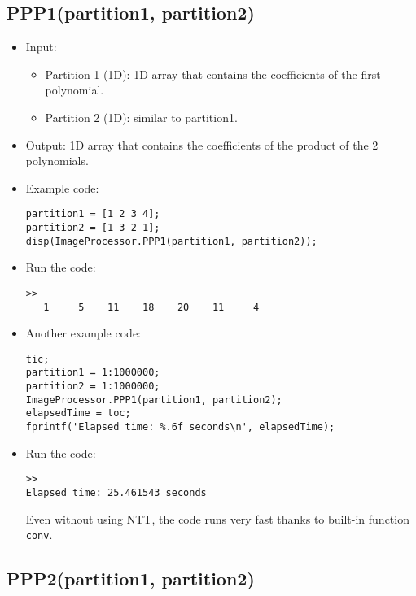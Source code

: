 \documentclass[11pt]{amsart}
\theoremstyle{remark}
\providecommand{\tightlist}{%
  \setlength{\itemsep}{0pt}\setlength{\parskip}{0pt}}
\theoremstyle{definition}
\theoremstyle{remark}
\numberwithin{equation}{section}
\begin{document}
\subsection{PPP1(partition1,
partition2)}\label{ppp1partition1-partition2}

\begin{itemize}
\item
  Input:

  \begin{itemize}
  \tightlist
  \item
    Partition 1 (1D): 1D array that contains the coefficients of the
    first polynomial.
  \item
    Partition 2 (1D): similar to partition1.
  \end{itemize}
\item
  Output: 1D array that contains the coefficients of the product of the
  2 polynomials.
\item
  Example code:

\begin{verbatim}
partition1 = [1 2 3 4];
partition2 = [1 3 2 1];
disp(ImageProcessor.PPP1(partition1, partition2));
\end{verbatim}
\item
  Run the code:

\begin{verbatim}
>> 
   1     5    11    18    20    11     4
\end{verbatim}
\item
  Another example code:

\begin{verbatim}
tic;
partition1 = 1:1000000;
partition2 = 1:1000000;
ImageProcessor.PPP1(partition1, partition2);
elapsedTime = toc;
fprintf('Elapsed time: %.6f seconds\n', elapsedTime);
\end{verbatim}
\item
  Run the code:

\begin{verbatim}
>> 
Elapsed time: 25.461543 seconds
\end{verbatim}

  Even without using NTT, the code runs very fast thanks to built-in
  function \texttt{conv}.
\end{itemize}

\subsection{PPP2(partition1,
partition2)}\label{ppp2partition1-partition2}
\end{document}
